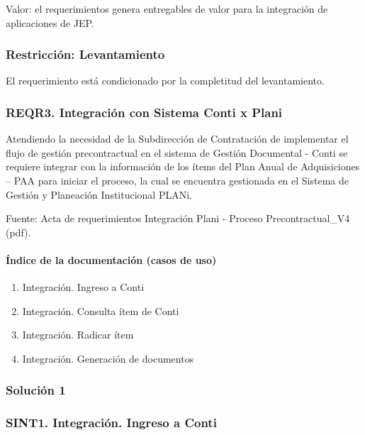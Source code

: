 \documentclass[
  paper=a4,
  ,captions=tableheading
]{scrartcl}
\providecommand{\tightlist}{%
  \setlength{\itemsep}{0pt}\setlength{\parskip}{0pt}}
\begin{document}
Valor: el requerimientos genera entregables de valor para la integración
de aplicaciones de JEP.

\subsubsection{Restricción:
Levantamiento}\label{sec:restricciuxf3n-levantamiento}

El requerimiento está condicionado por la completitud del levantamiento.

\subsubsection{REQR3. Integración con Sistema Conti x
Plani}\label{sec:reqr3.-integraciuxf3n-con-sistema-conti-x-plani}

Atendiendo la necesidad de la Subdirección de Contratación de
implementar el flujo de gestión precontractual en el sistema de Gestión
Documental - Conti se requiere integrar con la información de los ítems
del Plan Anual de Adquisiciones -- PAA para iniciar el proceso, la cual
se encuentra gestionada en el Sistema de Gestión y Planeación
Institucional PLANi.

Fuente: Acta de requerimientos Integración Plani - Proceso
Precontractual\_V4 (pdf).

\paragraph{Índice de la documentación (casos de
uso)}\label{sec:uxedndice-de-la-documentaciuxf3n-casos-de-uso}

\begin{enumerate}
\def\labelenumi{\arabic{enumi}.}
\tightlist
\item
  Integración. Ingreso a Conti
\item
  Integración. Consulta ítem de Conti
\item
  Integración. Radicar ítem
\item
  Integración. Generación de documentos
\end{enumerate}

\subsubsection{Solución 1}\label{sec:soluciuxf3n-1}

\subsubsection{SINT1. Integración. Ingreso a
Conti}\label{sec:sint1.-integraciuxf3n.-ingreso-a-conti}
\end{document}
